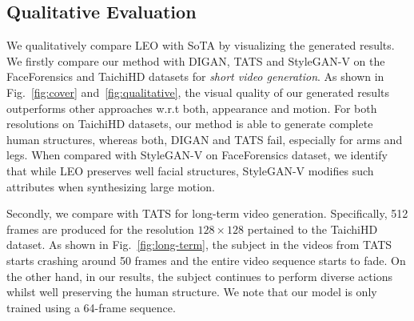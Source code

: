 {\subsection{Qualitative Evaluation}
We qualitatively compare LEO with SoTA by visualizing the generated results. We firstly compare our method with DIGAN, TATS and StyleGAN-V on the FaceForensics and TaichiHD datasets for \textit{short video generation}. As shown in Fig.~\ref{fig:cover} and~\ref{fig:qualitative}, the visual quality of our generated results outperforms other approaches w.r.t both, appearance and motion. For both resolutions on TaichiHD datasets, our method is able to generate complete human structures, whereas both, DIGAN and TATS fail, especially for arms and legs. When compared with StyleGAN-V on FaceForensics dataset, we identify that while LEO preserves well facial structures, StyleGAN-V modifies such attributes when synthesizing large motion. 

Secondly, we compare with TATS for long-term video generation. Specifically, 512 frames are produced for the resolution $128\times 128$ pertained to the TaichiHD dataset. As shown in Fig.~\ref{fig:long-term}, the subject in the videos from TATS starts crashing around 50 frames and the entire video sequence starts to fade. On the other hand, in our results, the subject continues to perform diverse actions whilst well preserving the human structure. We note that our model is only trained using a 64-frame sequence.

}
